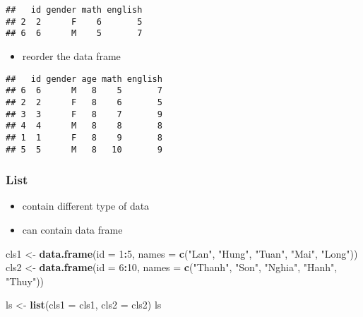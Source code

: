 \documentclass[
  a4paper,
]{article}
\newenvironment{Shaded}{\begin{snugshade}}{\end{snugshade}}
\newcommand{\AttributeTok}[1]{\textcolor[rgb]{0.13,0.29,0.53}{#1}}
\newcommand{\DecValTok}[1]{\textcolor[rgb]{0.00,0.00,0.81}{#1}}
\newcommand{\FunctionTok}[1]{\textcolor[rgb]{0.13,0.29,0.53}{\textbf{#1}}}
\newcommand{\NormalTok}[1]{#1}
\newcommand{\OtherTok}[1]{\textcolor[rgb]{0.56,0.35,0.01}{#1}}
\newcommand{\SpecialCharTok}[1]{\textcolor[rgb]{0.81,0.36,0.00}{\textbf{#1}}}
\newcommand{\StringTok}[1]{\textcolor[rgb]{0.31,0.60,0.02}{#1}}
\providecommand{\tightlist}{%
  \setlength{\itemsep}{0pt}\setlength{\parskip}{0pt}}
\begin{document}
\begin{verbatim}
##   id gender math english
## 2  2      F    6       5
## 6  6      M    5       7
\end{verbatim}

\begin{itemize}
\tightlist
\item
  reorder the data frame
\end{itemize}

\begin{Shaded}
\end{Shaded}

\begin{verbatim}
##   id gender age math english
## 6  6      M   8    5       7
## 2  2      F   8    6       5
## 3  3      F   8    7       9
## 4  4      M   8    8       8
## 1  1      F   8    9       8
## 5  5      M   8   10       9
\end{verbatim}

\subsubsection{List}\label{list}

\begin{itemize}
\tightlist
\item
  contain different type of data
\item
  can contain data frame
\end{itemize}

\begin{Shaded}
\begin{Highlighting}[]
\NormalTok{cls1 }\OtherTok{\textless{}{-}} \FunctionTok{data.frame}\NormalTok{(}\AttributeTok{id =} \DecValTok{1}\SpecialCharTok{:}\DecValTok{5}\NormalTok{, }\AttributeTok{names =} \FunctionTok{c}\NormalTok{(}\StringTok{"Lan"}\NormalTok{, }\StringTok{"Hung"}\NormalTok{, }\StringTok{"Tuan"}\NormalTok{,}
    \StringTok{"Mai"}\NormalTok{, }\StringTok{"Long"}\NormalTok{))}
\NormalTok{cls2 }\OtherTok{\textless{}{-}} \FunctionTok{data.frame}\NormalTok{(}\AttributeTok{id =} \DecValTok{6}\SpecialCharTok{:}\DecValTok{10}\NormalTok{, }\AttributeTok{names =} \FunctionTok{c}\NormalTok{(}\StringTok{"Thanh"}\NormalTok{, }\StringTok{"Son"}\NormalTok{, }\StringTok{"Nghia"}\NormalTok{,}
    \StringTok{"Hanh"}\NormalTok{, }\StringTok{"Thuy"}\NormalTok{))}

\NormalTok{ls }\OtherTok{\textless{}{-}} \FunctionTok{list}\NormalTok{(}\AttributeTok{cls1 =}\NormalTok{ cls1, }\AttributeTok{cls2 =}\NormalTok{ cls2)}
\NormalTok{ls}
\end{Highlighting}
\end{Shaded}
\end{document}
